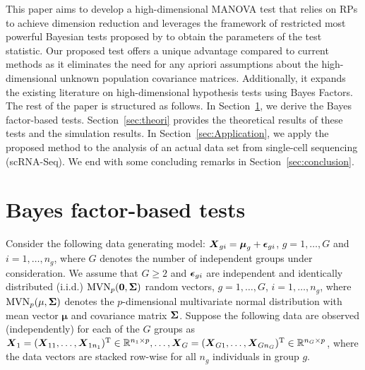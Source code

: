 \documentclass[pdflatex,sn-basic]{sn-jnl}%
\def\bzero{{\mathbf 0}}
\def\MVN{\hbox{MVN}}
\def\trans{^{\rm T}}
\def\bzero{{\mathbf 0}}
\newcommand{\uS}       {\mbox{\boldmath$S$}}
\newcommand{\uX}       {\mbox{\boldmath$X$}}
\newcommand{\uepsilon}          {\mbox{\boldmath$\epsilon$}}
\newcommand{\umu}               {\mbox{\boldmath$\mu$}}
\newcommand{\uSigma}            {\mbox{\boldmath$\Sigma$}}
\theoremstyle{thmstyleone}%
\theoremstyle{thmstyletwo}%
\theoremstyle{thmstylethree}%
\begin{document}
This paper aims to develop a high-dimensional MANOVA test that relies on RPs to achieve dimension reduction and leverages the framework of restricted most powerful Bayesian tests proposed by \cite{GoddardJohnson} to obtain the parameters of the test statistic. Our proposed test offers a unique advantage compared to current methods as it eliminates the need for any apriori assumptions about the high-dimensional unknown population covariance matrices. Additionally, it expands the existing literature on high-dimensional hypothesis tests using Bayes Factors. %
The rest of the paper is structured as follows. In Section~\ref{sec:test}, we derive the Bayes factor-based tests. Section~\ref{sec:theori} provides the theoretical results of these tests and the simulation results. In Section~\ref{sec:Application}, we apply the proposed method to the analysis of an actual data set from single-cell sequencing (scRNA-Seq). We end with some concluding remarks in Section~\ref{sec:conclusion}. 

\section{Bayes factor-based tests} \label{sec:test}

Consider the following data generating model: $\uX_{gi} = \umu_g + \uepsilon_{gi}$, $g = 1, \ldots, G$ and $i=1, \ldots, n_{g}$, where $G$ denotes the number of independent groups under consideration. 
We assume that $G \geq 2$ and $\uepsilon_{gi}$ are independent and identically distributed (i.i.d.) $\MVN_{p}(\bzero, \uSigma)$ random vectors, $g = 1,\ldots,G$, $i = 1,\ldots,n_g$, where $\MVN_{p}(\mathbf{\mu},\uSigma)$ denotes the $p$-dimensional multivariate normal distribution with mean vector $\mathbf{\mu}$ and covariance matrix $\uSigma$. Suppose the following data are observed (independently) for each of the $G$ groups as $\uX_1 = (\uX_{11}, \ldots, \uX_{1n_1})\trans \in \mathbb{R}^{n_1 \times p}, \ldots,  \uX_G  = (\uX_{G1}, \ldots, \uX_{Gn_G})\trans \in \mathbb{R}^{n_G \times p}$, where the data vectors are stacked row-wise for all $n_g$ individuals in group $g$. %
\end{document}
